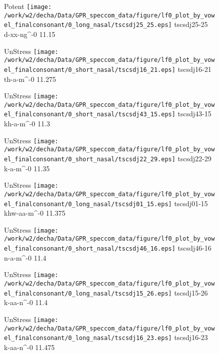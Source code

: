 \documentclass{article}
\begin{document}
\begin{figure}[t]
\begin{minipage}[b]{.24\textwidth}
\colorbox{Apricot}{Potent}
\centering
\texttt{[image: /work/w2/decha/Data/GPR\_speccom\_data/figure/lf0\_plot\_by\_vowel\_finalconsonant/0\_long\_nasal/tscsdj25\_25.eps]}
tscsdj25-25 d-xx-ng\textasciicircum-0 11.15
\end{minipage}
\begin{minipage}[b]{.24\textwidth}
UnStress
\centering
\texttt{[image: /work/w2/decha/Data/GPR\_speccom\_data/figure/lf0\_plot\_by\_vowel\_finalconsonant/0\_short\_nasal/tscsdj16\_21.eps]}
tscsdj16-21 th-a-m\textasciicircum-0 11.275
\end{minipage}
\begin{minipage}[b]{.24\textwidth}
UnStress
\centering
\texttt{[image: /work/w2/decha/Data/GPR\_speccom\_data/figure/lf0\_plot\_by\_vowel\_finalconsonant/0\_short\_nasal/tscsdj43\_15.eps]}
tscsdj43-15 kh-a-m\textasciicircum-0 11.3
\end{minipage}
\begin{minipage}[b]{.24\textwidth}
UnStress
\centering
\texttt{[image: /work/w2/decha/Data/GPR\_speccom\_data/figure/lf0\_plot\_by\_vowel\_finalconsonant/0\_short\_nasal/tscsdj22\_29.eps]}
tscsdj22-29 k-a-m\textasciicircum-0 11.35
\end{minipage}
\end{figure}

\begin{figure}[t]
\begin{minipage}[b]{.24\textwidth}
UnStress
\centering
\texttt{[image: /work/w2/decha/Data/GPR\_speccom\_data/figure/lf0\_plot\_by\_vowel\_finalconsonant/0\_long\_nasal/tscsdj01\_15.eps]}
tscsdj01-15 khw-aa-m\textasciicircum-0 11.375
\end{minipage}
\begin{minipage}[b]{.24\textwidth}
UnStress
\centering
\texttt{[image: /work/w2/decha/Data/GPR\_speccom\_data/figure/lf0\_plot\_by\_vowel\_finalconsonant/0\_short\_nasal/tscsdj46\_16.eps]}
tscsdj46-16 n-a-m\textasciicircum-0 11.4
\end{minipage}
\begin{minipage}[b]{.24\textwidth}
UnStress
\centering
\texttt{[image: /work/w2/decha/Data/GPR\_speccom\_data/figure/lf0\_plot\_by\_vowel\_finalconsonant/0\_long\_nasal/tscsdj15\_26.eps]}
tscsdj15-26 k-aa-n\textasciicircum-0 11.4
\end{minipage}
\begin{minipage}[b]{.24\textwidth}
UnStress
\centering
\texttt{[image: /work/w2/decha/Data/GPR\_speccom\_data/figure/lf0\_plot\_by\_vowel\_finalconsonant/0\_long\_nasal/tscsdj16\_23.eps]}
tscsdj16-23 k-aa-n\textasciicircum-0 11.475
\end{minipage}
\end{figure}
\end{document}
